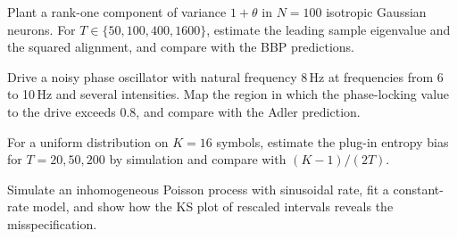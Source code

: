 \begin{exercise}
Plant a rank-one component of variance $1+\theta$ in $N=100$ isotropic
Gaussian neurons. For $T\in\{50,100,400,1600\}$, estimate the leading
sample eigenvalue and the squared alignment, and compare with the BBP
predictions.
\end{exercise}
\begin{exercise}
Drive a noisy phase oscillator with natural frequency 8\,Hz at
frequencies from 6 to 10\,Hz and several intensities. Map the region in
which the phase-locking value to the drive exceeds 0.8, and compare with
the Adler prediction.
\end{exercise}
\begin{exercise}
For a uniform distribution on $K=16$ symbols, estimate the plug-in
entropy bias for $T=20,50,200$ by simulation and compare with
$(K-1)/(2T)$.
\end{exercise}
\begin{exercise}
Simulate an inhomogeneous Poisson process with sinusoidal rate, fit a
constant-rate model, and show how the KS plot of rescaled intervals
reveals the misspecification.
\end{exercise}
